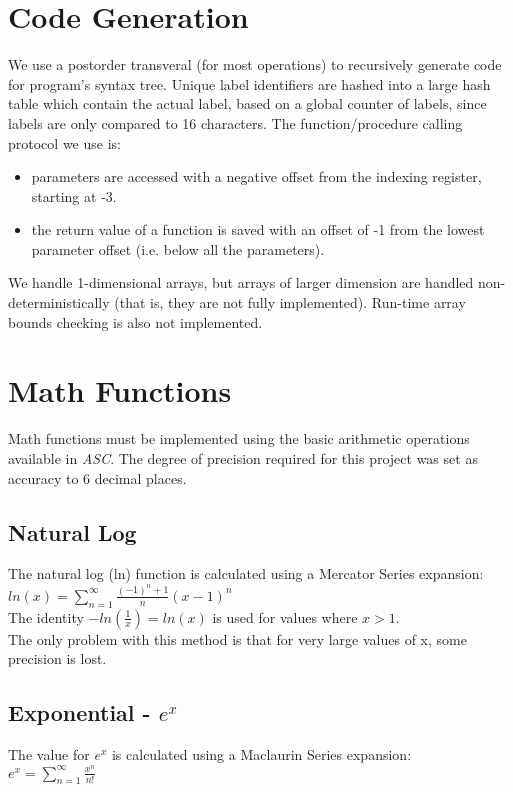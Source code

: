 \documentclass{report}
\begin{document}
\section*{Code Generation}
We use a postorder transveral (for most operations) to recursively generate code for program's syntax tree. Unique label identifiers are hashed into a large hash table which contain the actual label, based on a global counter of labels, since labels are only compared to 16 characters. The function/procedure calling protocol we use is:
\begin{itemize}
\item parameters are accessed with a negative offset from the indexing register, starting at -3.
\item the return value of a function is saved with an offset of -1 from the lowest parameter offset (i.e. below all the parameters).
\end{itemize}
We handle 1-dimensional arrays, but arrays of larger dimension are handled non-deterministically (that is, they are not fully implemented). Run-time array bounds checking is also not implemented.

\section*{Math Functions}
Math functions must be implemented using the basic arithmetic operations available in \emph{ASC}. The degree of precision required for this project was set as accuracy to 6 decimal places.
\subsection*{Natural Log}
The natural log (ln) function is calculated using a Mercator Series expansion:\\
$ ln(x) = \displaystyle\sum_{n=1}^{\infty} \frac{(-1)^n+1}{n} (x-1)^n $ \\
The identity $ -ln(\frac{1}{x}) = ln(x)$ is used for values where $x > 1$.\\
The only problem with this method is that for very large values of x, some precision is lost. 

\subsection*{Exponential - $e^x$}
The value for $e^x$ is calculated using a Maclaurin Series expansion:\\
$ e^x = \displaystyle\sum_{n=1}^{\infty} \frac{x^n}{n!}  $ \\
\end{document}
